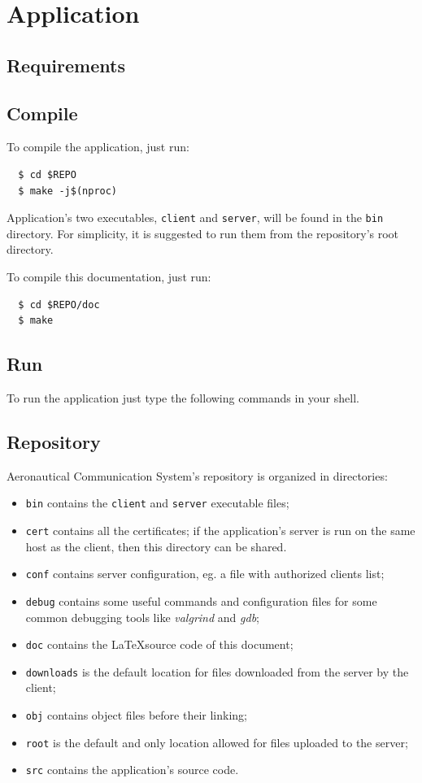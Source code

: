 \documentclass[a4paper,12pt]{article}
\newcommand{\projectname}{Aeronautical Communication System}
\begin{document}
\section{Application}
\subsection{Requirements}

\subsection{Compile}
To compile the application, just run:
\begin{verbatim}
  $ cd $REPO
  $ make -j$(nproc)
\end{verbatim}

Application's two executables, \texttt{client} and \texttt{server}, will be found in the \texttt{bin} directory.
For simplicity, it is suggested to run them from the repository's root directory.

To compile this documentation, just run:
\begin{verbatim}
  $ cd $REPO/doc
  $ make
\end{verbatim}

\subsection{Run}
To run the application just type the following commands in your shell.

\subsection{Repository}%
\projectname{}'s repository is organized in directories:
\begin{itemize}
  \item \texttt{bin} contains the \texttt{client} and \texttt{server} executable files;
  \item \texttt{cert} contains all the certificates; if the application's server is run on the same host as the client, then this directory can be shared.
  \item \texttt{conf} contains server configuration, eg. a file with authorized clients list;
  \item \texttt{debug} contains some useful commands and configuration files for some common debugging tools like \emph{valgrind} and \emph{gdb};
  \item \texttt{doc} contains the \LaTeX source code of this document;
  \item \texttt{downloads} is the default location for files downloaded from the server by the client;
  \item \texttt{obj} contains object files before their linking;
  \item \texttt{root} is the default and only location allowed for files uploaded to the server;
  \item \texttt{src} contains the application's source code.
\end{itemize}
\end{document}
